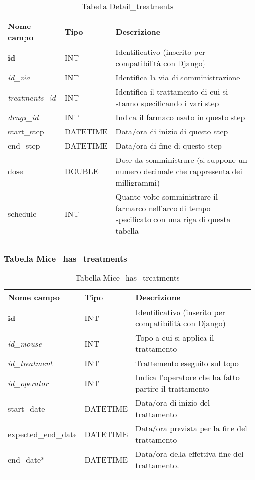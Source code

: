 \begin{longtable}{|l|l|p{6.5cm}|}
\hline
\textbf{Nome campo} &	\textbf{Tipo} &	\textbf{Descrizione}\\ \hline
\textbf{id}	&	INT	&	Identificativo (inserito per compatibilit\`a con Django)\\ \hline
\textit{id\_via}	&	INT	&	Identifica la via di somministrazione\\ \hline
\textit{treatments\_id} &		INT	&	Identifica il trattamento di cui si stanno specificando i vari step\\ \hline
\textit{drugs\_id} &	INT	&	Indica il farmaco usato in questo step\\ \hline
start\_step	&	DATETIME	&	Data/ora di inizio di questo step\\ \hline
end\_step	&	DATETIME	&	Data/ora di fine di questo step\\ \hline
dose &	DOUBLE	&	Dose da somministrare (si suppone un numero decimale che rappresenta dei milligrammi)\\ \hline
schedule &	INT	&	Quante volte somministrare il farmarco nell'arco di tempo specificato con una riga di questa tabella\\ \hline
\caption{Tabella Detail\_treatments}
\end{longtable}

\subsubsection{Tabella Mice\_has\_treatments}

\begin{longtable}{|l|l|p{5.5cm}|}
\hline
\textbf{Nome campo} &	\textbf{Tipo} &	\textbf{Descrizione}\\ \hline
\textbf{id}	 & INT	 & Identificativo (inserito per compatibilit\`a con Django)\\ \hline
\textit{id\_mouse} &	INT & 	Topo a cui si applica il trattamento\\ \hline
\textit{id\_treatment} &  INT & Trattemento eseguito sul topo\\ \hline
\textit{id\_operator} & 	INT	 & Indica l'operatore che ha fatto partire il trattamento\\ \hline
start\_date &	DATETIME	 & Data/ora di inizio del trattamento\\ \hline
expected\_end\_date & 	DATETIME	 & Data/ora prevista per la fine del trattamento\\ \hline
end\_date* & 	DATETIME & 	Data/ora della effettiva fine del trattamento.\\ \hline
\caption{Tabella Mice\_has\_treatments}
\end{longtable}

